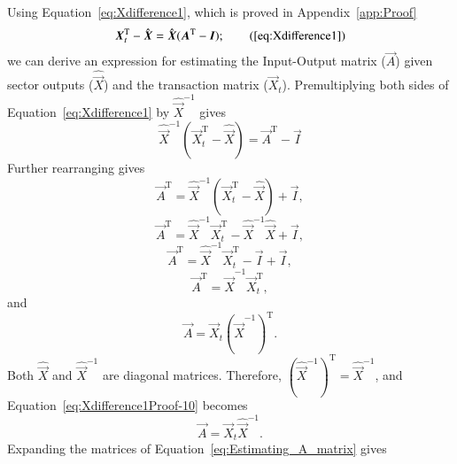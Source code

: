 Using Equation~\ref{eq:Xdifference1}, which is proved in Appendix~\ref{app:Proof}
%
\begin{equation}
	\vec{X}_{t}^\mathrm{T} 
	- \hat{\vec{X}} 
	= \hat{\vec{X}}(\vec{A}^\mathrm{T} - \vec{I});
	\tag{\ref{eq:Xdifference1}}
\end{equation}
%
we can derive an expression for estimating the Input-Output matrix ($\vec{A}$)
given sector outputs ($\hat{\vec{X}}$) and the transaction matrix ($\vec{X}_{t}$).
Premultiplying both sides of Equation~\ref{eq:Xdifference1} by $\hat{\vec{X}}^{-1}$ gives
%
\begin{equation} \label{eq:Xdifference1Proof-5}
	\hat{\vec{X}}^{-1}
	\left( 
		\vec{X}_{t}^\mathrm{T} 
		- \hat{\vec{X}} 
	\right)
	= \vec{A}^\mathrm{T} - \vec{I}
\end{equation}
%
Further rearranging gives
%
\begin{equation}\label{eq:Xdifference1Proof-6}
	\vec{A}^\mathrm{T} 
	= \hat{\vec{X}}^{-1}
	\left( 
		\vec{X}_{t}^\mathrm{T} 
		- \hat{\vec{X}} 
	\right)
	+ \vec{I},
\end{equation}
%
\begin{equation}\label{eq:Xdifference1Proof-7}
	\vec{A}^\mathrm{T} 
	= \hat{\vec{X}}^{-1} \vec{X}_{t}^\mathrm{T} 
	- \hat{\vec{X}}^{-1} \hat{\vec{X}}
	+ \vec{I},	
\end{equation}
%
\begin{equation}\label{eq:Xdifference1Proof-8}
	\vec{A}^\mathrm{T} 
	= \hat{\vec{X}}^{-1} \vec{X}_{t}^\mathrm{T} 
	- \vec{I}
	+ \vec{I},	
\end{equation}
%
\begin{equation}\label{eq:Xdifference1Proof-9}
	\vec{A}^\mathrm{T} 
	= \hat{\vec{X}}^{-1} 
	\vec{X}_{t}^\mathrm{T},
\end{equation}
%
and
%
\begin{equation}\label{eq:Xdifference1Proof-10}
	\vec{A} 
	= \vec{X}_{t}
	{\left( {\hat{\vec{X}}^{-1}} \right)}^\mathrm{T}.
\end{equation}
%
Both $\hat{\vec{X}}$ and $\hat{\vec{X}}^{-1}$
are diagonal matrices. Therefore, 
${\left( \hat{\vec{X}}^{-1} \right)}^{\mathrm{T}} = \hat{\vec{X}}^{-1}$, 
and Equation~\ref{eq:Xdifference1Proof-10} becomes
%
\begin{equation}\label{eq:Estimating_A_matrix} 
	\vec{A} 
	= \vec{X}_{t}
	\hat{\vec{X}}^{-1}.
\end{equation}
%
Expanding the matrices of Equation~\ref{eq:Estimating_A_matrix} gives
%
